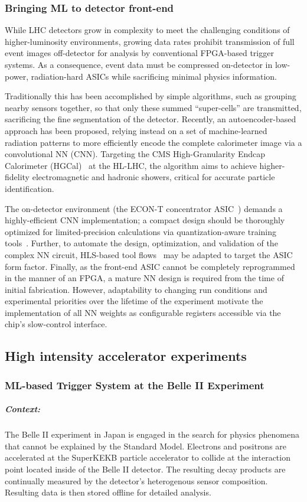 \subsubsection{Bringing ML to detector front-end}

While LHC detectors grow in complexity to meet the challenging conditions of higher-luminosity environments, growing data rates prohibit transmission of full event images off-detector for analysis by conventional FPGA-based trigger systems.
As a consequence, event data must be compressed on-detector in low-power, radiation-hard ASICs while sacrificing minimal physics information.

Traditionally this has been accomplished by simple algorithms, such as grouping nearby sensors together, so that only these summed ``super-cells'' are transmitted, sacrificing the fine segmentation of the detector.
Recently, an autoencoder-based approach has been proposed, relying instead on a set of machine-learned radiation patterns to more efficiently encode the complete calorimeter image via a convolutional NN (CNN).
Targeting the CMS High-Granularity Endcap Calorimeter (HGCal)~\cite{collaboration:2017gbu} at the HL-LHC, the algorithm aims to achieve higher-fidelity electromagnetic and hadronic showers, critical for accurate particle identification.

The on-detector environment (the ECON-T concentrator ASIC~\cite{collaboration:2017gbu}) demands a highly-efficient CNN implementation; a compact design should be thoroughly optimized for limited-precision calculations via quantization-aware training tools~\cite{qkeraspaper}.
Further, to automate the design, optimization, and validation of the complex NN circuit, HLS-based tool flows~\cite{Duarte:2018ite} may be adapted to target the ASIC form factor.
Finally, as the front-end ASIC cannot be completely reprogrammed in the manner of an FPGA, a mature NN design is required from the time of initial fabrication.
However, adaptability to changing run conditions and experimental priorities over the lifetime of the experiment motivate the implementation of all NN weights as configurable registers accessible via the chip's slow-control interface.

\subsection{High intensity accelerator experiments}
\subsubsection{ML-based Trigger System at the Belle II Experiment}
\subparagraph*{Context:} The Belle II experiment in Japan is engaged in the search for physics phenomena that cannot be explained by the Standard Model. Electrons and positrons are accelerated at the SuperKEKB particle accelerator to collide at the interaction point located inside of the Belle II detector. 
The resulting decay products are continually measured by the detector’s heterogenous sensor composition. Resulting data is then stored offline for detailed analysis. 

